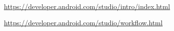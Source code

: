 \begin{thebibliography}{99999}
\singlespace\normalsize

 \url{https://developer.android.com/studio/intro/index.html}


 \url{https://developer.android.com/studio/workflow.html}


\end{thebibliography}